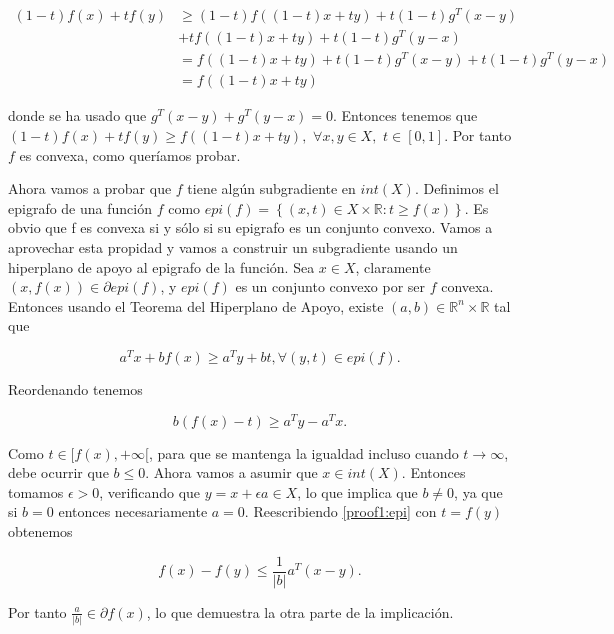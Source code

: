 \begin{align*}
	(1-t)f(x) + tf(y) &\geq  (1-t)f((1-t)x+ty) + t(1-t)g^T(x-y) \\
	&+ tf((1-t)x+ty) + t(1-t)g^T(y-x) \\
	 &= f((1-t)x + ty) + t(1-t) g^T(x-y) + t(1-t)g^T(y-x) \\
	&= f((1-t)x+ty)
\end{align*}

donde se ha usado que $g^T(x-y) + g^T(y-x)=0$. Entonces tenemos que $(1-t)f(x) + tf(y) \geq f((1-t)x + ty), $ $ \forall x,y \in X, $ $ t \in [0,1]$. Por tanto $f$ es convexa, como queríamos probar.

Ahora vamos a probar que $f$ tiene algún subgradiente en $int(X)$. Definimos el epigrafo de una función $f$ como $epi(f)=\left \{ (x,t) \in X \times \mathbb{R} : t \geq f(x) \right \}$. Es obvio que f es convexa si y sólo si su epigrafo es un conjunto convexo. Vamos a aprovechar esta propidad y vamos a construir un subgradiente usando un hiperplano de apoyo al epigrafo de la función. Sea $x \in X$, claramente $(x, f(x)) \in \partial epi(f)$, y $epi(f)$ es un conjunto convexo por ser $f$ convexa. Entonces usando el Teorema del Hiperplano de Apoyo, existe $(a,b) \in \mathbb{R}^n \times \mathbb{R}$ tal que

\begin{equation}\label{proof1:epi}
    a^Tx + bf(x) \geq a^Ty + bt, \forall (y,t) \in epi(f).
\end{equation}

Reordenando tenemos

$$b(f(x)-t) \geq a^Ty - a^Tx.$$

Como $t \in [f(x), + \infty [$, para que se mantenga la igualdad incluso cuando $t \rightarrow \infty$, debe ocurrir que $b\leq 0$. Ahora vamos a asumir que $x \in int(X)$. Entonces tomamos $\epsilon > 0$, verificando que $y=x+\epsilon a \in X$, lo que implica que $b\neq 0$, ya que si $b=0$ entonces necesariamente $a=0$. Reescribiendo \ref{proof1:epi} con $t=f(y)$ obtenemos

$$f(x) - f(y) \leq \frac{1}{|b|} a^T (x-y).$$

Por tanto $\frac{a}{|b|} \in \partial f(x)$, lo que demuestra la otra parte de la implicación.

